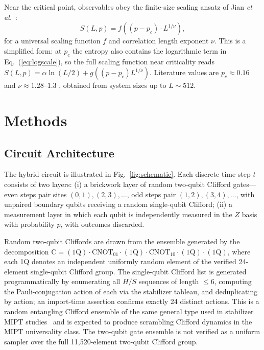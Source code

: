 \documentclass[twocolumn,prl,aps,floatfix]{revtex4-2}
\begin{document}
Near the critical point, observables obey the finite-size scaling ansatz
of Jian \textit{et al.}~\cite{Jian2020}:
\begin{equation}
  S(L,p) = f\!\left((p - p_c)\cdot L^{1/\nu}\right),
  \label{eq:fss}
\end{equation}
for a universal scaling function $f$ and correlation length exponent $\nu$.
This is a simplified form: at $p_c$ the entropy also contains the logarithmic
term in Eq.~(\ref{eq:logscale}), so the full scaling function near criticality
reads $S(L,p) = \alpha\ln(L/2) + g\!\left((p-p_c)L^{1/\nu}\right)$.
Literature values are $p_c \approx 0.16$ and $\nu \approx 1.28$--$1.3$
\cite{Li2019,Zabalo2020}, obtained from system sizes up to $L \sim 512$.

\section{Methods}
\label{sec:methods}

\subsection{Circuit Architecture}

The hybrid circuit is illustrated in Fig.~\ref{fig:schematic}.
Each discrete time step $t$ consists of two layers:
(i) a brickwork layer of random two-qubit Clifford gates---even steps pair
sites $(0,1),(2,3),\ldots$, odd steps pair $(1,2),(3,4),\ldots$, with unpaired
boundary qubits receiving a random single-qubit Clifford;
(ii) a measurement layer in which each qubit is independently measured in the
$Z$ basis with probability $p$, with outcomes discarded.

Random two-qubit Cliffords are drawn from the ensemble generated by the
decomposition
$\mathrm{C} = (\mathrm{1Q})\cdot\mathrm{CNOT}_{01}\cdot(\mathrm{1Q})\cdot
\mathrm{CNOT}_{10}\cdot(\mathrm{1Q})\cdot(\mathrm{1Q})$,
where each 1Q denotes an independent uniformly random element of the
verified 24-element single-qubit Clifford group.
The single-qubit Clifford list is generated programmatically by enumerating
all $H/S$ sequences of length $\leq 6$, computing the Pauli-conjugation
action of each via the stabilizer tableau, and deduplicating by action;
an import-time assertion confirms exactly 24 distinct actions.
This is a random entangling Clifford ensemble of the same general type used in stabilizer MIPT studies~\cite{Li2019} and is expected to produce scrambling
Clifford dynamics in the MIPT universality class.
The two-qubit gate ensemble is not verified as a uniform sampler over the
full 11,520-element two-qubit Clifford group.
\end{document}
